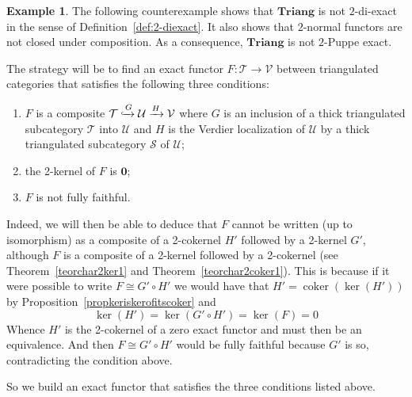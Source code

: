 \documentclass[11pt,reqno,a4paper]{amsart}
\theoremstyle{definition}
\newtheorem{example}[theorem]{Example}
\theoremstyle{remark}
\def\nameit#1{\textrm{#1}~}
\def\thex{\nameit{Theorem}}
\def\prox{\nameit{Proposition}}
\DeclareMathOperator{\coker}{coker}
\newenvironment{enum}{\begin{enumerate}[label=$($\hspace{0.12ex}\roman*\hspace{0.075ex}$)$]}{\end{enumerate}}
\newcommand{\T}{\mathcal{T}}
\renewcommand{\S}{\mathcal{S}}
\newcommand{\U}{\mathcal{U}}
\newcommand{\V}{\mathcal{V}}
\newcommand{\0}{\mathbf{0}}
\renewcommand{\1}{\mathbf{1}}
\newcommand{\Triang}{\mathbf{Triang}}
\def\:{\colon}
\def\c{\circ}
\newcommand{\iso}{\cong}
\newcommand{\aar}[2][]{\xrightarrow[#1]{#2}}
\begin{document}
\begin{example}\label{ex:tri-not-diexact}
    The following counterexample shows that $\Triang$ is not
    $2$-di-exact in the sense of Definition~\ref{def:2-diexact}.
    It also shows that $2$-normal functors are not closed under
    composition. As a consequence, $\Triang$ is not $2$-Puppe exact.

    The strategy will be to find an exact functor $F\:\T\to \V$ between triangulated categories that satisfies the following three conditions:
    \begin{enum}
        \item $F$ is a composite $\T\xhookrightarrow{G} \U \aar{H}\V$ where $G$ is an inclusion of a thick triangulated subcategory $\T$ into $\U$ and $H$ is the Verdier localization of $\U$ by a thick triangulated subcategory $\S$ of $\U$;
        \item the 2-kernel of $F$ is $\0$;
        \item $F$ is not fully faithful.
    \end{enum}
    Indeed, we will then be able to deduce that $F$ cannot be written (up to isomorphism) as a composite of a 2-cokernel $H'$ followed by a 2-kernel $G'$, although $F$ is a composite of a 2-kernel followed by a 2-cokernel (see \thex\ref{teorchar2ker1} and \thex\ref{teorchar2coker1}). This is because if it were possible to write $F\iso G'\c H'$ we would have that $H'=\coker(\ker(H'))$ by \prox\ref{propkeriskerofitscoker} and
    $$\ker(H')=\ker(G'\c H')=\ker(F)=0$$
    Whence $H'$ is the 2-cokernel of a zero exact functor and must then be an equivalence. And then $F\iso G'\c H'$ would be fully faithful because $G'$ is so, contradicting the condition above.

    So we build an exact functor that satisfies the three conditions listed above.


\end{example}
\end{document}
